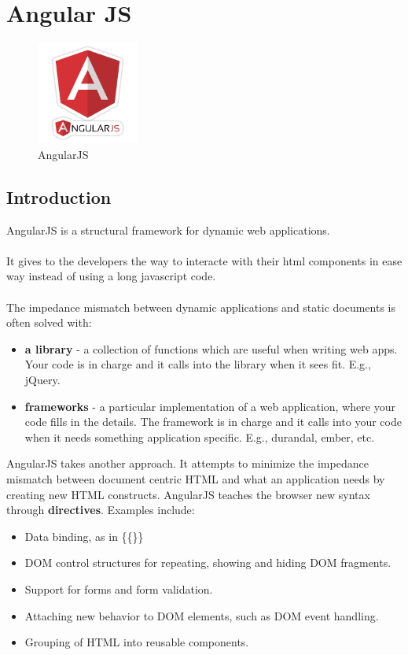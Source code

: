 \clearpage
\newpage

	\section{Angular JS}
		\begin{figure}[h]
		\centering
		\includegraphics[width=0.3\textwidth]{AngularJS_logo.png}
		\caption{AngularJS}
	\end{figure}
		\subsection{Introduction}
	AngularJS is a structural framework for dynamic web applications.
	\\
	\\
	It gives to the developers the way to interacte with their html components in ease way instead of using a long javascript code.
	\\
	\\
	The impedance mismatch between dynamic applications and static documents is often solved with:
	\begin{itemize}
		
		\item \textbf{a library} - a collection of functions which are useful when writing web apps. Your code is in charge and it calls into the library when it sees fit. E.g., \colorbox{mygray}{jQuery}.
		\item \textbf{frameworks} - a particular implementation of a web application, where your code fills in the details. The framework is in charge and it calls into your code when it needs something application specific. E.g., \colorbox{mygray}{durandal}, \colorbox{mygray}{ember}, etc.
	\end{itemize}
	AngularJS takes another approach. It attempts to minimize the impedance mismatch between document centric HTML and what an application needs by creating new HTML constructs. AngularJS teaches the browser new syntax through \textbf{directives}. Examples include:
	\begin{itemize}
		\item Data binding, as in \colorbox{mygray}{\{\{\}\}}
		\item DOM control structures for repeating, showing and hiding DOM fragments.
		\item Support for forms and form validation.
		\item Attaching new behavior to DOM elements, such as DOM event handling.
		\item Grouping of HTML into reusable components.	
	\end{itemize}
